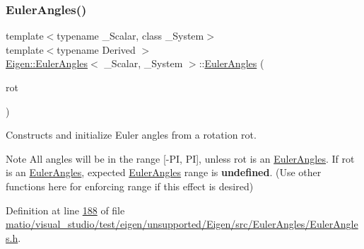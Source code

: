 \mbox{\label{class_eigen_1_1_euler_angles_a22539c574d7b6ca4577691f533f60061}} 
\subsubsection{\texorpdfstring{Euler\+Angles()}{EulerAngles()}\hspace{0.1cm}{\footnotesize\ttfamily [11/12]}}
{\footnotesize\ttfamily template$<$typename \+\_\+\+Scalar, class \+\_\+\+System$>$ \\
template$<$typename Derived $>$ \\
\hyperlink{class_eigen_1_1_euler_angles}{Eigen\+::\+Euler\+Angles}$<$ \+\_\+\+Scalar, \+\_\+\+System $>$\+::\hyperlink{class_eigen_1_1_euler_angles}{Euler\+Angles} (\begin{DoxyParamCaption}\item[{const \hyperlink{class_eigen_1_1_rotation_base}{Rotation\+Base}$<$ Derived, 3 $>$ \&}]{rot }\end{DoxyParamCaption})\hspace{0.3cm}{\ttfamily [inline]}}

Constructs and initialize Euler angles from a rotation {\ttfamily rot}.

\begin{DoxyNote}{Note}
All angles will be in the range \mbox{[}-\/\+PI, PI\mbox{]}, unless {\ttfamily rot} is an \hyperlink{class_eigen_1_1_euler_angles}{Euler\+Angles}. If rot is an \hyperlink{class_eigen_1_1_euler_angles}{Euler\+Angles}, expected \hyperlink{class_eigen_1_1_euler_angles}{Euler\+Angles} range is {\bfseries undefined}. (Use other functions here for enforcing range if this effect is desired) 
\end{DoxyNote}


Definition at line \hyperlink{matio_2visual__studio_2test_2eigen_2unsupported_2_eigen_2src_2_euler_angles_2_euler_angles_8h_source_l00188}{188} of file \hyperlink{matio_2visual__studio_2test_2eigen_2unsupported_2_eigen_2src_2_euler_angles_2_euler_angles_8h_source}{matio/visual\+\_\+studio/test/eigen/unsupported/\+Eigen/src/\+Euler\+Angles/\+Euler\+Angles.\+h}.

\mbox{\label{class_eigen_1_1_euler_angles_aeaf9524ff49ee720786e78f44c23cc17}} 
